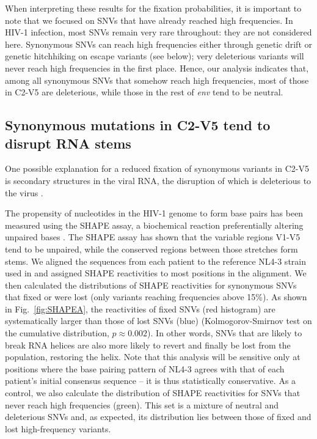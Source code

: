 \documentclass[11pt]{article}
\newcommand{\FIG}[1]{Fig.~\ref{fig:#1}}
\newcommand{\env}{\textit{env}}
\newcommand{\shankaregion}{C2-V5}
\begin{document}
When interpreting these results for the fixation probabilities, it is important
to note that we focused on SNVs that have already reached high frequencies. In
HIV-1 infection, most SNVs remain very rare throughout: they are not considered
here. Synonymous SNVs can reach high frequencies either through genetic
drift or genetic hitchhiking on escape variants (see below); very deleterious
variants will never reach high frequencies in the first place. Hence, our
analysis indicates that, among all synonymous SNVs that somehow reach high
frequencies, most of those in \shankaregion{} are deleterious, while
those in the rest of \env{} tend to be neutral.

\subsection*{Synonymous mutations in \shankaregion{} tend to disrupt RNA stems}
One possible explanation for a reduced fixation of synonymous variants in
\shankaregion{} is secondary structures in the viral RNA, the disruption of which
is deleterious to the virus \citep{forsdyke_reciprocal_1995,
snoeck_mapping_2011, sanjuan_interplay_2011}.

The propensity of nucleotides in the HIV-1 genome to form base pairs has been
measured using the SHAPE assay, a biochemical reaction preferentially altering
unpaired bases 
\citep{watts_architecture_2009}. The SHAPE assay has shown that the variable
regions V1-V5 tend to be unpaired, while the conserved regions between those
stretches form stems. We aligned the sequences from each patient to
the reference NL4-3 strain used in \citet{watts_architecture_2009} and assigned
SHAPE reactivities to most positions in the alignment. We then calculated the
distributions of SHAPE reactivities for synonymous SNVs that fixed or were
lost (only variants reaching frequencies above 15\%). As shown in
\FIG{SHAPEA}, the reactivities of fixed SNVs (red histogram) are systematically
larger than those of lost SNVs (blue) (Kolmogorov-Smirnov test on the cumulative
distribution, $p\approx 0.002$). In other words, SNVs that are likely to
break RNA helices are also more likely to revert and finally be lost from the
population, restoring the helix. Note that this analysis will be sensitive only
at positions where the base pairing pattern of NL4-3 agrees with that of each
patient's initial consensus sequence -- it is thus statistically conservative.
As a control, we also calculate the distribution of SHAPE reactivities for SNVs
that never reach high frequencies (green). This set is a mixture of neutral and
deleterious SNVs and, as expected, its distribution lies between those of
fixed and lost high-frequency variants.
\end{document}

